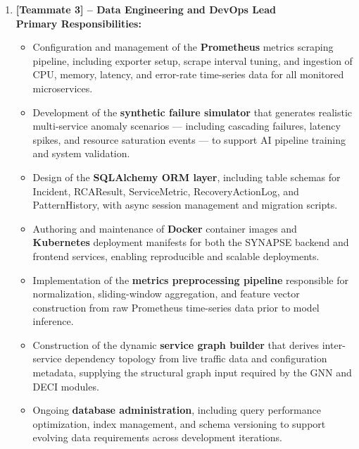 \begin{enumerate}
    \item \textbf{[Teammate 3] -- Data Engineering and DevOps Lead}\\
    \textbf{Primary Responsibilities:}
    \begin{itemize}
        \item Configuration and management of the \textbf{Prometheus} metrics scraping pipeline, including exporter setup, scrape interval tuning, and ingestion of CPU, memory, latency, and error-rate time-series data for all monitored microservices.
        \item Development of the \textbf{synthetic failure simulator} that generates realistic multi-service anomaly scenarios — including cascading failures, latency spikes, and resource saturation events — to support AI pipeline training and system validation.
        \item Design of the \textbf{SQLAlchemy ORM layer}, including table schemas for Incident, RCAResult, ServiceMetric, RecoveryActionLog, and PatternHistory, with async session management and migration scripts.
        \item Authoring and maintenance of \textbf{Docker} container images and \textbf{Kubernetes} deployment manifests for both the SYNAPSE backend and frontend services, enabling reproducible and scalable deployments.
        \item Implementation of the \textbf{metrics preprocessing pipeline} responsible for normalization, sliding-window aggregation, and feature vector construction from raw Prometheus time-series data prior to model inference.
        \item Construction of the dynamic \textbf{service graph builder} that derives inter-service dependency topology from live traffic data and configuration metadata, supplying the structural graph input required by the GNN and DECI modules.
        \item Ongoing \textbf{database administration}, including query performance optimization, index management, and schema versioning to support evolving data requirements across development iterations.
    \end{itemize}


\end{enumerate}
